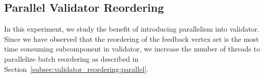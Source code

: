 \subsection{Parallel Validator Reordering}
In this experiment, we study the benefit of introducing parallelism into validator. Since we have observed that the reordering of the feedback vertex set is the most time consuming subcomponent in validator, we increase the number of threads to parallelize batch reordering as described in Section~\ref{subsec:validator_reordering:parallel}.

